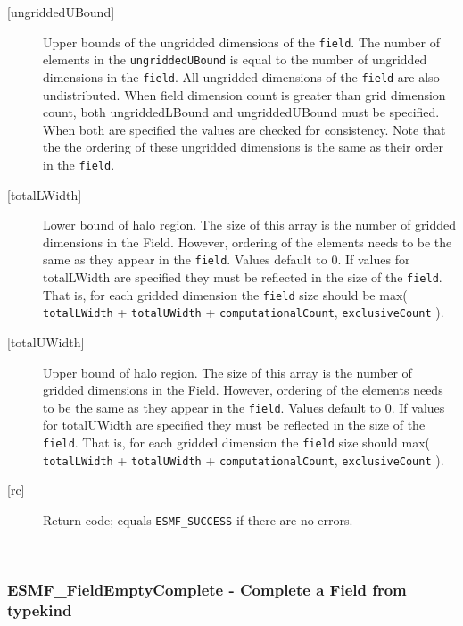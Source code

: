 \begin{description}
   \item [{[ungriddedUBound]}]
   Upper bounds of the ungridded dimensions of the {\tt field}.
   The number of elements in the {\tt ungriddedUBound} is equal to the number of ungridded
   dimensions in the {\tt field}. All ungridded dimensions of the
   {\tt field} are also undistributed. When field dimension count is
   greater than grid dimension count, both ungriddedLBound and ungriddedUBound
   must be specified. When both are specified the values are checked
   for consistency. Note that the the ordering of
   these ungridded dimensions is the same as their order in the {\tt field}.
   \item [{[totalLWidth]}]
   Lower bound of halo region. The size of this array is the number
   of gridded dimensions in the Field. However, ordering of the elements
   needs to be the same as they appear in the {\tt field}. Values default
   to 0. If values for totalLWidth are specified they must be reflected in
   the size of the {\tt field}. That is, for each gridded dimension the
   {\tt field} size should be max( {\tt totalLWidth} + {\tt totalUWidth}
   + {\tt computationalCount}, {\tt exclusiveCount} ).
   \item [{[totalUWidth]}]
   Upper bound of halo region. The size of this array is the number
   of gridded dimensions in the Field. However, ordering of the elements
   needs to be the same as they appear in the {\tt field}. Values default
   to 0. If values for totalUWidth are specified they must be reflected in
   the size of the {\tt field}. That is, for each gridded dimension the
   {\tt field} size should max( {\tt totalLWidth} + {\tt totalUWidth}
   + {\tt computationalCount}, {\tt exclusiveCount} ).
   \item [{[rc]}]
   Return code; equals {\tt ESMF\_SUCCESS} if there are no errors.
   \end{description} 
 
\mbox{}\hrulefill\ 
 
\subsubsection [ESMF\_FieldEmptyComplete] {ESMF\_FieldEmptyComplete - Complete a Field from typekind}



